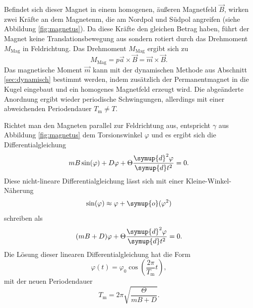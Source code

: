 Befindet sich dieser Magnet in einem homogenen, äußeren Magnetfeld $\vec{B}$, wirken zwei
Kräfte an dem Magnetenm, die am Nordpol und Südpol angreifen (siehe Abbildung \ref{fig:magnetus}).
Da diese Kräfte den gleichen Betrag haben, führt der Magnet keine Translationsbewegung aus
sondern rotiert durch das Drehmoment $M_{\mathrm{Mag}}$ in Feldrichtung.
Das Drehmoment $M_{\mathrm{Mag}}$ ergibt sich zu
\begin{equation}
	M_{\mathrm{Mag}} = p \vec{a} \times \vec{B} = \vec{m} \times \vec{B} \mathrm{.}
\end{equation}
Das magnetische Moment $\vec{m}$ kann mit der dynamischen Methode aus Abschnitt
\ref{sec:dynamisch} bestimmt werden, indem zusätzlich der Permanentmagnet in die Kugel eingebaut
und ein homogenes Magnetfeld erzeugt wird.
Die abgeänderte Anordnung ergibt wieder periodische Schwingungen, allerdings mit einer
abweichenden Periodendauer $T_{\mathrm{m}} \neq T$.

Richtet man den Magneten parallel zur Feldrichtung aus, entspricht $\gamma$ aus Abbildung
\ref{fig:magnetus} dem Torsionswinkel $\varphi$ und es ergibt sich die Differentialgleichung
\begin{equation}
	m B \sin(\varphi)  + D \varphi + \Theta \frac{\symup{d}^2 \varphi}{\symup{d} t^2} = 0
	\mathrm{.}
\end{equation}
Diese nicht-lineare Differentialgleichung lässt sich mit einer Kleine-Winkel-Näherung
\begin{equation*}
	\sin(\varphi) \approx \varphi + \symup{o}(\varphi^2)
\end{equation*}
schreiben als
\begin{equation}
	\label{eqn:jkadsfl}
	(mB + D) \varphi + \Theta \frac{\symup{d}^2 \varphi}{\symup{d} t^2} = 0 \mathrm{.}
\end{equation}
Die Lösung dieser linearen Differentialgleichung hat die Form
\begin{equation}
	\varphi(t) = \varphi_0 \cos(\frac{2\pi}{T_{\mathrm{m}}} t) \mathrm{,}
\end{equation}
mit der neuen Periodendauer
\begin{equation}
	\label{eqn:periodemagnet}
	T_{\mathrm{m}} = 2\pi \sqrt{\frac{\Theta}{mB + D}} \mathrm{.}
\end{equation}
